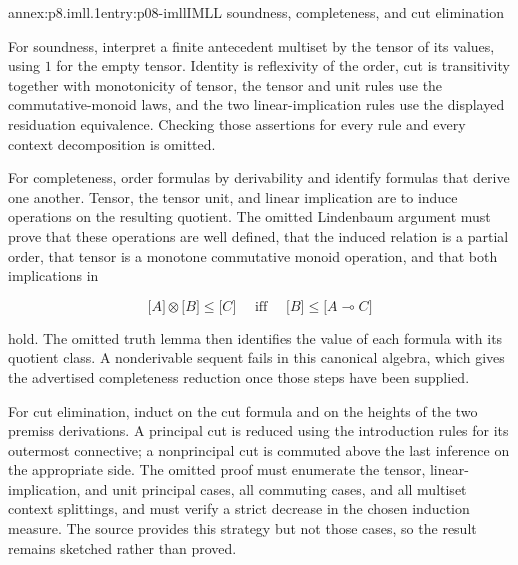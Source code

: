
\begin{annexitem}{annex:p8.imll.1}{entry:p08-imll}{IMLL soundness, completeness, and cut elimination}

For soundness, interpret a finite antecedent multiset by the tensor of its
values, using \(1\) for the empty tensor.  Identity is reflexivity of the
order, cut is transitivity together with monotonicity of tensor, the tensor
and unit rules use the commutative-monoid laws, and the two linear-implication
rules use the displayed residuation equivalence.  Checking those assertions
for every rule and every context decomposition is omitted.

For completeness, order formulas by derivability and identify formulas that
derive one another.  Tensor, the tensor unit, and linear implication are to
induce operations on the resulting quotient.  The omitted Lindenbaum
argument must prove that these operations are well defined, that the induced
relation is a partial order, that tensor is a monotone commutative monoid
operation, and that both implications in

\[
 \lbrack A\rbrack\otimes\lbrack B\rbrack
 \leq\lbrack C\rbrack
 \quad\text{ iff }\quad
 \lbrack B\rbrack\leq\lbrack A\multimap C\rbrack
\]

hold.  The omitted truth lemma then identifies the value of each formula with
its quotient class.  A nonderivable sequent fails in this canonical algebra,
which gives the advertised completeness reduction once those steps have been
supplied.

For cut elimination, induct on the cut formula and on the heights of the two
premiss derivations.  A principal cut is reduced using the introduction rules
for its outermost connective; a nonprincipal cut is commuted above the last
inference on the appropriate side.  The omitted proof must enumerate the
tensor, linear-implication, and unit principal cases, all commuting cases, and
all multiset context splittings, and must verify a strict decrease in the
chosen induction measure.  The source provides this strategy but not those
cases, so the result remains sketched rather than proved.
\end{annexitem}

